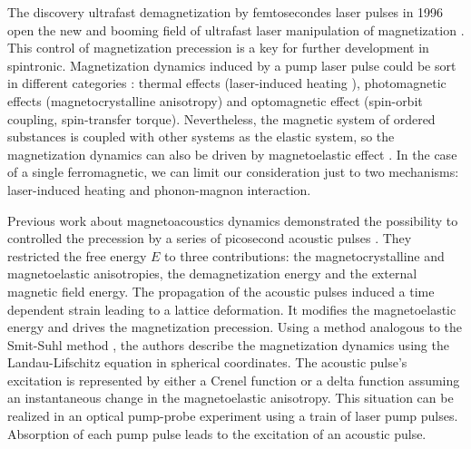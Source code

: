 \documentclass[%
superscriptaddress,
preprint,
showpacs,
amsmath,
amssymb,
aps,
prl,
]{revtex4-1}
\begin{document}
The discovery ultrafast demagnetization by femtosecondes laser pulses in 1996 \cite{beaurepaire1996ultrafast} open the new and booming field of ultrafast
laser manipulation of magnetization \cite{koopmans2000ultrafast,van2002all,guidoni2002magneto,zhang2002coherent,vomir2005real,bigot2005ultrafast,kimel2005ultrafast,malinowski2008control,bigot2009coherent,bovensiepen2009femtomagnetism,radu2009laser,carpene2010ultrafast,boeglin2010distinguishing,radu2011transient,rudolf2012ultrafast,bombeck2013magnetization,kim2012ultrafast,kim2015controlling,kim2017magnetization}.
This control of magnetization precession is a key for further development in spintronic.
Magnetization dynamics induced by a pump laser pulse could be sort in different categories \cite{kirilyuk2010ultrafast}: thermal effects (laser-induced heating \cite{van2002all,carpene2010ultrafast}), photomagnetic effects (magnetocrystalline anisotropy) and optomagnetic effect (spin-orbit coupling, spin-transfer torque\cite{nvemec2012experimental,razdolski2017nanoscale,alekhin2017femtosecond}).
Nevertheless, the magnetic system of ordered substances is coupled with other systems as the elastic system, so the magnetization dynamics can also be driven by magnetoelastic effect \cite{beaurepaire1996ultrafast,kim2012ultrafast,bombeck2012excitation,temnov2012ultrafast,bombeck2013magnetization,kim2015controlling,januvsonis2016ultrafast,kim2017magnetization,chang2017parametric}.
In the case of a single ferromagnetic, we can limit our consideration just to two mechanisms: laser-induced heating and phonon-magnon interaction.

Previous work about magnetoacoustics dynamics demonstrated the possibility to controlled the precession by a series of picosecond acoustic pulses \cite{kim2012ultrafast,kim2015controlling,kim2017magnetization}.
They restricted the free energy $E$ to three contributions: the magnetocrystalline and magnetoelastic anisotropies, the demagnetization energy and the external magnetic field energy.
The propagation of the acoustic pulses induced a time dependent strain leading to a lattice deformation. %
It modifies the magnetoelastic energy and drives the magnetization precession.
Using a method analogous to the Smit-Suhl method \cite{smit1955ferromagnetic,suhl1955ferromagnetic}, the authors describe the magnetization dynamics using the Landau-Lifschitz equation in spherical coordinates.   
The acoustic pulse's excitation is represented by either a Crenel function or a delta function assuming an instantaneous change in the magnetoelastic anisotropy.
This situation can be realized in an optical pump-probe experiment using a train of laser pump pulses. 
Absorption of each pump pulse leads to the excitation of an acoustic pulse. 
\end{document}

